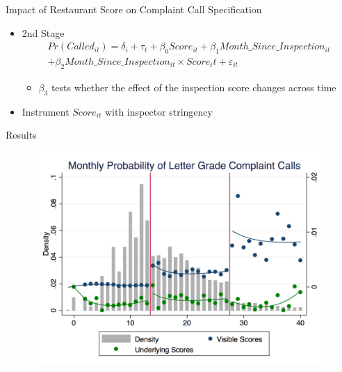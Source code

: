 \documentclass[handout]{beamer}
\begin{document}
\begin{frame}{Impact of Restaurant Score on Complaint Call Specification}
\begin{itemize}
\item 2nd Stage
\begin{align*}
    Pr(Called_{it}) = \delta_i + \tau_t + \beta_0 Score_{it} + \beta_1 Month\_Since\_Inspection_{it} \\
    + \beta_2 Month\_Since\_Inspection_{it} \times Score_it + \varepsilon_{it}
\end{align*}
\begin{itemize}
\item $\beta_3$ tests whether the effect of the inspection score changes across time
\end{itemize}
\item Instrument $Score_{it}$ with inspector stringency
\end{itemize}
\end{frame}


\begin{frame}{Results}
\begin{table}
\scalebox{0.5}{}
\end{table}
\end{frame}

\iffalse

\begin{frame}
\begin{figure}
\centering
\includegraphics[scale = 0.35]{../../Figures/Calls/score_calls_hist_vis}
\end{figure}
\end{frame}
\end{document}

